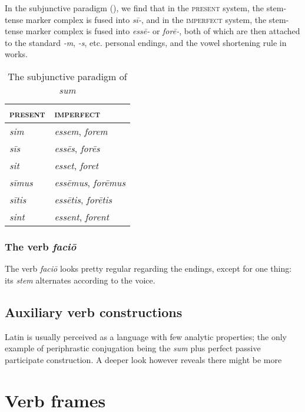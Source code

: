 \documentclass[a4paper, oneside, 12pt]{report}
\newcommand{\form}[1]{\emph{#1}}
\newcommand*{\category}[1]{\textsc{#1}}
\begin{document}
In the subjunctive paradigm (),
we find that in the \category{present} system, 
the stem-tense marker complex is fused into \form{sī-},
and in the \category{imperfect} system,
the stem-tense marker complex is fused into \form{ess\={e}-} or \form{for\={e}-},
both of which are then attached to the standard \form{-m}, \form{-s}, etc. 
personal endings, 
and the vowel shortening rule in  works.

\begin{table}[H]
    \caption{The subjunctive paradigm of \form{sum}}
    \centering
    \label{tbl:subjunctive-sum}
    \begin{tabular}{ll}
    \toprule
    \category{present}   & \category{imperfect}   \\ \midrule
    \form{sim}       & \form{essem}, \form{forem}       \\
    \form{sīs}   & \form{ess\={e}s}, \form{for\={e}s}   \\
    \form{sit}       & \form{esset}, \form{foret}       \\
    \form{sīmus} & \form{ess\={e}mus}, \form{for\={e}mus} \\
    \form{sītis} & \form{ess\={e}tis}, \form{for\={e}tis} \\
    \form{sint}      & \form{essent}, \form{forent}     \\ \bottomrule
    \end{tabular}
\end{table}

\subsection{The verb \form{faci\={o}}}

The verb \form{faci\={o}} looks pretty regular
regarding the endings, 
except for one thing: 
its \emph{stem} alternates according to the voice.

\section{Auxiliary verb constructions}

Latin is usually perceived as a language with few analytic properties;
the only example of periphrastic conjugation 
being the \form{sum} plus perfect passive participate construction.
A deeper look however reveals 
there might be more 

\chapter{Verb frames}\label{chap:verb-frame}
\end{document}
